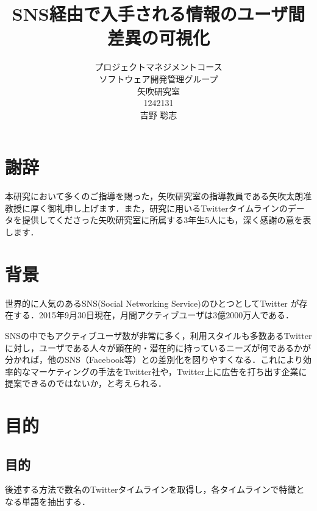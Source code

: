 ﻿\usepackage{here}
\usepackage{ascmac}
\usepackage{here}
\usepackage{txfonts}
\usepackage{listings, jlisting}
\renewcommand{\lstlistingname}{リスト}
\lstset{
  basicstyle=\ttfamily,
  commentstyle=\textit,
  classoffset=1,
  keywordstyle=\bfseries,
  frame=single,
  framesep=5pt,
  showstringspaces=false,
  numbers=left,
  stepnumber=1,
  numberstyle=\tiny,
  tabsize=2,
  breaklines=true
}

\title{SNS経由で入手される情報のユーザ間差異の可視化}
\author{プロジェクトマネジメントコース\\
ソフトウェア開発管理グループ\\
矢吹研究室\\
1242131\\
吉野 聡志}
\date{}

\maketitle

\chapter*{謝辞}
本研究において多くのご指導を賜った，矢吹研究室の指導教員である矢吹太朗准教授に厚く御礼申し上げます．また，研究に用いるTwitterタイムラインのデータを提供してくださった矢吹研究室に所属する3年生5人にも，深く感謝の意を表します．

\tableofcontents%

\chapter{背景}
世界的に人気のあるSNS(Social Networking Service)のひとつとしてTwitter が存在する．2015年9月30日現在，月間アクティブユーザは3億2000万人である\cite{twitterinc}．

SNSの中でもアクティブユーザ数が非常に多く，利用スタイルも多数あるTwitter に対し，ユーザである人々が顕在的・潜在的に持っているニーズが何であるかが分かれば，他のSNS（Facebook等）との差別化を図りやすくなる．これにより効率的なマーケティングの手法をTwitter社や，Twitter上に広告を打ち出す企業に提案できるのではないか，と考えられる．

\chapter{目的}

\section{目的}
後述する方法で数名のTwitterタイムラインを取得し，各タイムラインで特徴となる単語を抽出する．

